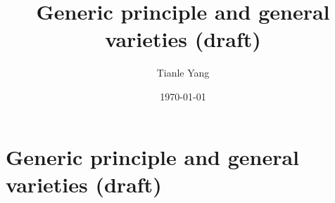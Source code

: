 \documentclass{noteformyself}
\title{Generic principle and general varieties (draft)}
\author{Tianle Yang}
\date{\today}
\begin{document}
    \maketitle

    \section{Generic principle and general varieties (draft)}



    \printbibliography[heading=bibintoc, title={References}] %
\end{document}
